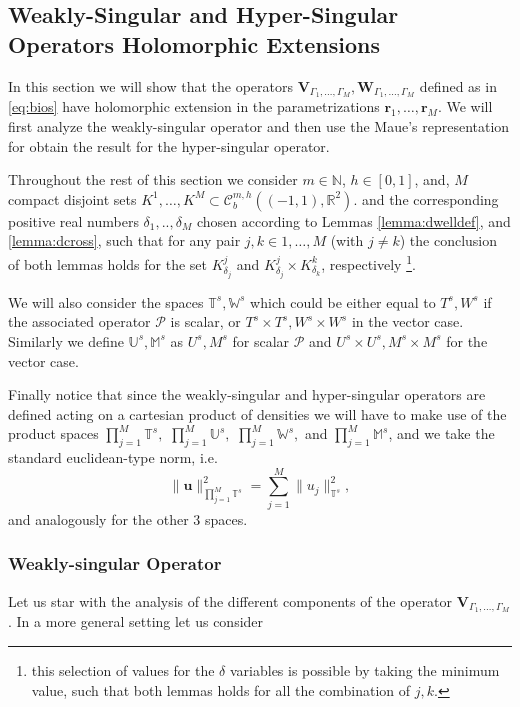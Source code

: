 \documentclass{article}
\newcommand{\IN}{{\mathbb N}}
\newcommand{\IM}{{\mathbb M}}
\newcommand{\IR}{{\mathbb R}}
\newcommand{\IU}{{\mathbb U}}
\newcommand{\IT}{{\mathbb T}}
\newcommand{\IW}{{\mathbb W}}
\newcommand{\rgeoh}[2]{\mathcal{C}_b^{#1,#2}\left( (-1,1), \IR^2 \right)}
\newcommand{\cP}{\mathcal{P}}
\newcommand{\bu}{\bm{u}}
\newcommand{\br}{\bm{r}}
\begin{document}
\subsection{Weakly-Singular and Hyper-Singular Operators Holomorphic Extensions}
In this section we will show that the operators $\mathbf{V}_{\Gamma_1,\hdots,\Gamma_M}, \mathbf{W}_{\Gamma_1,\hdots,\Gamma_M}$ defined as in \eqref{eq:bios} have holomorphic extension in the parametrizations $\br_1,\hdots,\br_M$. We will first analyze the weakly-singular operator and then use the Maue's representation for obtain the result for the hyper-singular operator. 

Throughout the rest of this section we consider $m\in \IN$, $h \in [0,1]$, and, $M$ compact disjoint sets $K^1,\hdots,K^M \subset \rgeoh{m}{h}$. and the corresponding positive real numbers $\delta_1, ..,\delta_M$ chosen according to Lemmas \ref{lemma:dwelldef}, and \ref{lemma:dcross}, such that for any pair $j,k \in 1,\hdots,M$ (with $j\neq k$) the conclusion of both lemmas holds for the set $K^j_{\delta_j}$ and $ K^j_{\delta_j}\times K^k_{\delta_k}$, respectively \footnote{this selection of values for the $\delta$ variables is possible by taking the minimum value, such that both lemmas holds for all the combination of $j,k$. }. 

We will also consider the spaces $\mathbb{T}^s, \mathbb{W}^s$ which could be either equal to $T^s,W^s$ if the associated operator $\cP$ is scalar, or $T^s\times T^s,W^s\times W^s$ in the vector case. Similarly we define $\mathbb{U}^s, \mathbb{M}^s$ as $U^s,M^s$ for scalar $\cP$ and $U^s\times U^s,M^s\times M^s$ for the vector case.

Finally notice that since the weakly-singular and hyper-singular operators are defined acting on a cartesian product of densities we will have to make use of the product spaces $\prod_{j=1}^M \IT^s,$ $\prod_{j=1}^M \IU^s,$ $\prod_{j=1}^M \IW^s,$ and $\prod_{j=1}^M \IM^s$, and we take the standard euclidean-type norm, i.e.
$$
\| \bu \|_{\prod_{j=1}^M \IT^s}^2 = \sum_{j=1}^M \| u_j \|_{\IT^s}^2,
$$ 
and analogously for the other 3 spaces. 																																																																			   
 
\subsubsection{Weakly-singular Operator}

Let us star with the analysis of the different components of the operator 
$\mathbf{V}_{\Gamma_1,\hdots,\Gamma_M}$. In a more general setting let us consider 
\end{document}
